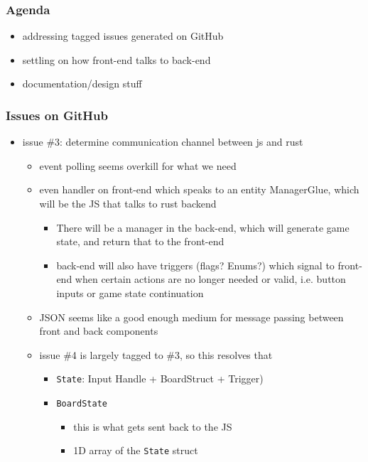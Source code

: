 \documentclass[11pt]{article}
\begin{document}
\subsubsection*{Agenda}
\label{sec:org52da78e}
\begin{itemize}
\item addressing tagged issues generated on GitHub
\item settling on how front-end talks to back-end
\item documentation/design stuff
\end{itemize}
\subsubsection*{Issues on GitHub}
\label{sec:orgcd6d217}
\begin{itemize}
\item issue \#3: determine communication channel between js and rust
\label{sec:org55b2512}
\begin{itemize}
\item event polling seems overkill for what we need
\item even handler on front-end which speaks to an entity ManagerGlue, which will be the JS that
talks to rust backend
\begin{itemize}
\item There will be a manager in the back-end, which will generate game state, and return that to
the front-end
\item back-end will also have triggers (flags? Enums?) which signal to front-end when certain
actions are no longer needed or valid, i.e. button inputs or game state continuation
\end{itemize}
\item JSON seems like a good enough medium for message passing between front and back components
\end{itemize}
\begin{itemize}
\item issue \#4 is largely tagged to \#3, so this resolves that
\label{sec:org74a4f41}
\begin{itemize}
\item \texttt{State}: Input Handle + BoardStruct + Trigger)
\item \texttt{BoardState}
\begin{itemize}
\item this is what gets sent back to the JS
\item 1D array of the \texttt{State} struct
\begin{itemize}

\end{itemize}
\end{itemize}
\end{itemize}
\end{itemize}
\end{itemize}
\end{document}
